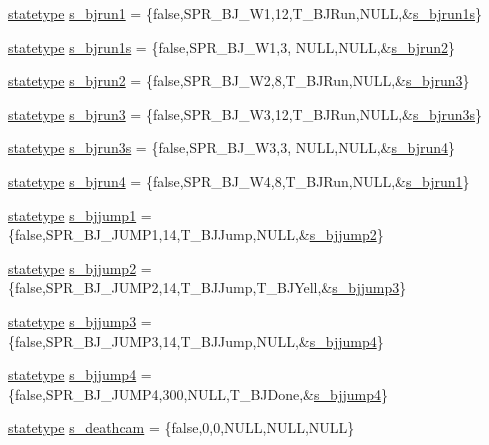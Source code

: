\begin{DoxyCompactItemize}
\item 
\hyperlink{structstatestruct}{statetype} \hyperlink{WL__ACT2_8C_a869fc21f9647e150cc5ccf7b186ea458}{s\_\-bjrun1} = \{false,SPR\_\-BJ\_\-W1,12,T\_\-BJRun,NULL,\&\hyperlink{WL__ACT2_8C_ab2f61e1d4966f403414c5e0db76fe380}{s\_\-bjrun1s}\}
\item 
\hyperlink{structstatestruct}{statetype} \hyperlink{WL__ACT2_8C_ab2f61e1d4966f403414c5e0db76fe380}{s\_\-bjrun1s} = \{false,SPR\_\-BJ\_\-W1,3, NULL,NULL,\&\hyperlink{WL__ACT2_8C_af57262a1d2d6bcc819652317bf15a4ab}{s\_\-bjrun2}\}
\item 
\hyperlink{structstatestruct}{statetype} \hyperlink{WL__ACT2_8C_af57262a1d2d6bcc819652317bf15a4ab}{s\_\-bjrun2} = \{false,SPR\_\-BJ\_\-W2,8,T\_\-BJRun,NULL,\&\hyperlink{WL__ACT2_8C_a66113b56ff2490b2b358ee648f30c863}{s\_\-bjrun3}\}
\item 
\hyperlink{structstatestruct}{statetype} \hyperlink{WL__ACT2_8C_a66113b56ff2490b2b358ee648f30c863}{s\_\-bjrun3} = \{false,SPR\_\-BJ\_\-W3,12,T\_\-BJRun,NULL,\&\hyperlink{WL__ACT2_8C_a16013a265bf5766cf1ab6831b88ce7a8}{s\_\-bjrun3s}\}
\item 
\hyperlink{structstatestruct}{statetype} \hyperlink{WL__ACT2_8C_a16013a265bf5766cf1ab6831b88ce7a8}{s\_\-bjrun3s} = \{false,SPR\_\-BJ\_\-W3,3, NULL,NULL,\&\hyperlink{WL__ACT2_8C_a1d97b64475eb24f6cec22d432d8fcba1}{s\_\-bjrun4}\}
\item 
\hyperlink{structstatestruct}{statetype} \hyperlink{WL__ACT2_8C_a1d97b64475eb24f6cec22d432d8fcba1}{s\_\-bjrun4} = \{false,SPR\_\-BJ\_\-W4,8,T\_\-BJRun,NULL,\&\hyperlink{WL__ACT2_8C_a869fc21f9647e150cc5ccf7b186ea458}{s\_\-bjrun1}\}
\item 
\hyperlink{structstatestruct}{statetype} \hyperlink{WL__ACT2_8C_ad95a6e38473888f6b3b141ff54ed0056}{s\_\-bjjump1} = \{false,SPR\_\-BJ\_\-JUMP1,14,T\_\-BJJump,NULL,\&\hyperlink{WL__ACT2_8C_aae89f6563edc5452bb5311e309fc2094}{s\_\-bjjump2}\}
\item 
\hyperlink{structstatestruct}{statetype} \hyperlink{WL__ACT2_8C_aae89f6563edc5452bb5311e309fc2094}{s\_\-bjjump2} = \{false,SPR\_\-BJ\_\-JUMP2,14,T\_\-BJJump,T\_\-BJYell,\&\hyperlink{WL__ACT2_8C_a59fc5f0c6e33a8d6d1dfafd3c775c20f}{s\_\-bjjump3}\}
\item 
\hyperlink{structstatestruct}{statetype} \hyperlink{WL__ACT2_8C_a59fc5f0c6e33a8d6d1dfafd3c775c20f}{s\_\-bjjump3} = \{false,SPR\_\-BJ\_\-JUMP3,14,T\_\-BJJump,NULL,\&\hyperlink{WL__ACT2_8C_a3fc57e5fc21a674fa9e5fc0faadf377b}{s\_\-bjjump4}\}
\item 
\hyperlink{structstatestruct}{statetype} \hyperlink{WL__ACT2_8C_a3fc57e5fc21a674fa9e5fc0faadf377b}{s\_\-bjjump4} = \{false,SPR\_\-BJ\_\-JUMP4,300,NULL,T\_\-BJDone,\&\hyperlink{WL__ACT2_8C_a3fc57e5fc21a674fa9e5fc0faadf377b}{s\_\-bjjump4}\}
\item 
\hyperlink{structstatestruct}{statetype} \hyperlink{WL__ACT2_8C_a7f671914a2f6c20217c29103a1dca042}{s\_\-deathcam} = \{false,0,0,NULL,NULL,NULL\}
\end{DoxyCompactItemize}


